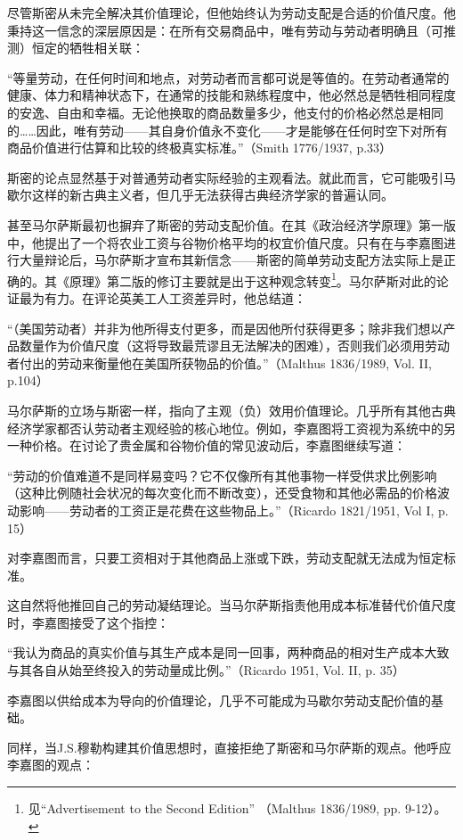 \begin{translation}
尽管斯密从未完全解决其价值理论，但他始终认为劳动支配是合适的价值尺度。他秉持这一信念的深层原因是：在所有交易商品中，唯有劳动与劳动者明确且（可推测）恒定的牺牲相关联：

“等量劳动，在任何时间和地点，对劳动者而言都可说是等值的。在劳动者通常的健康、体力和精神状态下，在通常的技能和熟练程度中，他必然总是牺牲相同程度的安逸、自由和幸福。无论他换取的商品数量多少，他支付的价格必然总是相同的……因此，唯有劳动——其自身价值永不变化——才是能够在任何时空下对所有商品价值进行估算和比较的终极真实标准。”（Smith 1776/1937, p.33）

斯密的论点显然基于对普通劳动者实际经验的主观看法。就此而言，它可能吸引马歇尔这样的新古典主义者，但几乎无法获得古典经济学家的普遍认同。

甚至马尔萨斯最初也摒弃了斯密的劳动支配价值。在其《政治经济学原理》第一版中，他提出了一个将农业工资与谷物价格平均的权宜价值尺度。只有在与李嘉图进行大量辩论后，马尔萨斯才宣布其新信念——斯密的简单劳动支配方法实际上是正确的。其《原理》第二版的修订主要就是出于这种观念转变\footnote{见“Advertisement to the Second Edition” （Malthus 1836/1989, pp. 9-12）。}。马尔萨斯对此的论证最为有力。在评论英美工人工资差异时，他总结道：

“（美国劳动者）并非为他所得支付更多，而是因他所付获得更多；除非我们想以产品数量作为价值尺度（这将导致最荒谬且无法解决的困难），否则我们必须用劳动者付出的劳动来衡量他在美国所获物品的价值。”（Malthus 1836/1989, Vol. II, p.104）

马尔萨斯的立场与斯密一样，指向了主观（负）效用价值理论。几乎所有其他古典经济学家都否认劳动者主观经验的核心地位。例如，李嘉图将工资视为系统中的另一种价格。在讨论了贵金属和谷物价值的常见波动后，李嘉图继续写道：

“劳动的价值难道不是同样易变吗？它不仅像所有其他事物一样受供求比例影响（这种比例随社会状况的每次变化而不断改变），还受食物和其他必需品的价格波动影响——劳动者的工资正是花费在这些物品上。”（Ricardo 1821/1951, Vol I, p. 15）

对李嘉图而言，只要工资相对于其他商品上涨或下跌，劳动支配就无法成为恒定标准。

这自然将他推回自己的劳动凝结理论。当马尔萨斯指责他用成本标准替代价值尺度时，李嘉图接受了这个指控：

“我认为商品的真实价值与其生产成本是同一回事，两种商品的相对生产成本大致与其各自从始至终投入的劳动量成比例。”（Ricardo 1951, Vol. II, p. 35）

李嘉图以供给成本为导向的价值理论，几乎不可能成为马歇尔劳动支配价值的基础。

同样，当J.S.穆勒构建其价值思想时，直接拒绝了斯密和马尔萨斯的观点。他呼应李嘉图的观点：


\end{translation}
